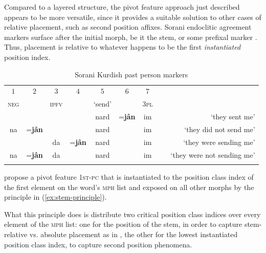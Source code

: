 \documentclass[output=paper
	        ,collection
	        ,collectionchapter
 	        ,biblatex
                ,babelshorthands
                ,newtxmath
                ,draftmode
                ,colorlinks, citecolor=brown
]{langscibook}
\begin{document}
\begin{exe}
\begin{xlist}
\begin{exe}
\begin{xlist}
Compared to a layered structure, the pivot feature approach just
described appears to be more versatile, since it provides a suitable
solution to other cases of relative placement, such as second position
affixes. Sorani  endoclitic agreement markers surface after the
initial morph, be it the stem, or some prefixal marker
\citep{Samvelian07}. Thus, placement is relative to whatever happens
to be the first \textit{instantiated} position index.

\begin{table}
\begin{center}
{\small
\begin{tabular}[t]{ccccccc|lr}
\lsptoprule
$1$ & $2$ & $3$ & $4$ & $5$ & $6$ & $7$ &\\
\textsc{neg} & & \textsc{ipfv} & & `send' & & \textsc{3pl}\\   
\midrule
    &&      && nard &=\textbf{jân} & im & ~ &{`they sent me'}\\
na & =\textbf{jân}     &  & & nard & & im & ~ &{`they did not send me'}\\
   & & da & =\textbf{jân} & nard & & im & ~ &{`they were sending me'}\\
na & =\textbf{jân}     &  da  & & nard & & im & ~ & {`they were not sending me'}\\
\lspbottomrule
\end{tabular}
}
\end{center}
\caption{Sorani Kurdish past person markers\label{table-kurdish}}
\label{tab:Sorani}
\end{table}

\citet{bonami_o-crysmann_b13hpsg} propose a pivot feature \textsc{1st-pc} that is
instantiated to the position class index of the first element on the
word's \textsc{mph} list and exposed on all other morphs by the
principle in (\ref{ex:stem-principle}).

\begin{exe}
  \ex\label{ex:stem-principle}
\end{exe}

What this principle does is distribute two critical position class
indices over every element of the \textsc{mph} list: one for the
position of the stem, in order to capture stem-relative vs. absolute placement as
in , the other for the lowest instantiated position class index,
to capture second position phenomena. 


\end{xlist}
\end{exe}
\end{xlist}
\end{exe}
\end{document}

